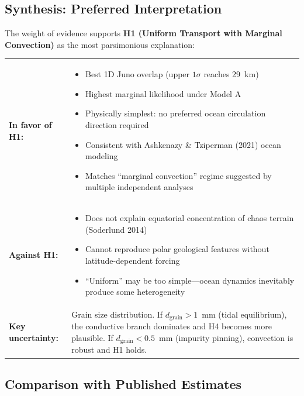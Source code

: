 \documentclass[11pt,letterpaper]{article}
\begin{document}
\subsection{Synthesis: Preferred Interpretation}

The weight of evidence supports \textbf{H1 (Uniform Transport with Marginal Convection)} as the most parsimonious explanation:

\begin{comparisonbox}
\begin{tabular}{@{}p{}p{}@{}}
\textbf{In favor of H1:} &
\begin{itemize}[nosep,leftmargin=*]
  \item Best 1D Juno overlap (upper $1\sigma$ reaches 29~km)
  \item Highest marginal likelihood under Model A
  \item Physically simplest: no preferred ocean circulation direction required
  \item Consistent with Ashkenazy \& Tziperman (2021) ocean modeling
  \item Matches ``marginal convection'' regime suggested by multiple independent analyses
\end{itemize} \\[6pt]
\textbf{Against H1:} &
\begin{itemize}[nosep,leftmargin=*]
  \item Does not explain equatorial concentration of chaos terrain (Soderlund 2014)
  \item Cannot reproduce polar geological features without latitude-dependent forcing
  \item ``Uniform'' may be too simple---ocean dynamics inevitably produce some heterogeneity
\end{itemize} \\[6pt]
\textbf{Key uncertainty:} &
Grain size distribution. If $d_\mathrm{grain} > 1$~mm (tidal equilibrium), the conductive branch dominates and H4 becomes more plausible. If $d_\mathrm{grain} < 0.5$~mm (impurity pinning), convection is robust and H1 holds.
\end{tabular}
\end{comparisonbox}

\subsection{Comparison with Published Estimates}
\end{document}
